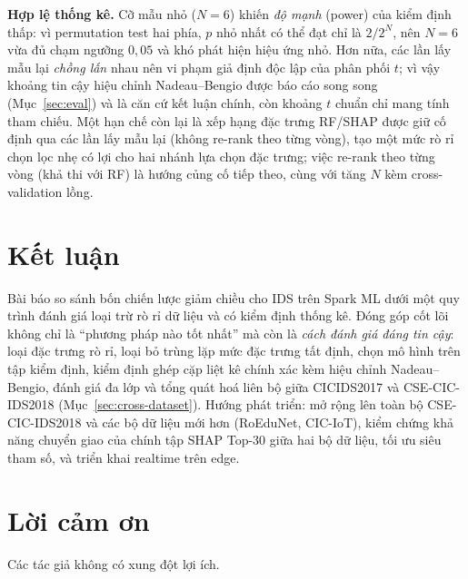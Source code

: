 \documentclass[conference]{IEEEtran}
\begin{document}
\textbf{Hợp lệ thống kê.} Cỡ mẫu nhỏ ($N{=}6$) khiến \emph{độ mạnh} (power) của kiểm định thấp: vì permutation test hai phía, $p$ nhỏ nhất có thể đạt chỉ là $2/2^N$, nên $N{=}6$ vừa đủ chạm ngưỡng $0{,}05$ và khó phát hiện hiệu ứng nhỏ. Hơn nữa, các lần lấy mẫu lại \emph{chồng lấn} nhau nên vi phạm giả định độc lập của phân phối $t$; vì vậy khoảng tin cậy hiệu chỉnh Nadeau--Bengio được báo cáo song song (Mục~\ref{sec:eval}) và là căn cứ kết luận chính, còn khoảng $t$ chuẩn chỉ mang tính tham chiếu. Một hạn chế còn lại là xếp hạng đặc trưng RF/SHAP được giữ cố định qua các lần lấy mẫu lại (không re-rank theo từng vòng), tạo một mức rò rỉ chọn lọc nhẹ có lợi cho hai nhánh lựa chọn đặc trưng; việc re-rank theo từng vòng (khả thi với RF) là hướng củng cố tiếp theo, cùng với tăng $N$ kèm cross-validation lồng.

\section{Kết luận}
\label{sec:conclude}

Bài báo so sánh bốn chiến lược giảm chiều cho IDS trên Spark ML dưới một quy trình đánh giá loại trừ rò rỉ dữ liệu và có kiểm định thống kê. Đóng góp cốt lõi không chỉ là ``phương pháp nào tốt nhất'' mà còn là \emph{cách đánh giá đáng tin cậy}: loại đặc trưng rò rỉ, loại bỏ trùng lặp mức đặc trưng tất định, chọn mô hình trên tập kiểm định, kiểm định ghép cặp liệt kê chính xác kèm hiệu chỉnh Nadeau--Bengio, đánh giá đa lớp và tổng quát hoá liên bộ giữa CICIDS2017 và CSE-CIC-IDS2018 (Mục~\ref{sec:cross-dataset}). Hướng phát triển: mở rộng lên toàn bộ CSE-CIC-IDS2018 và các bộ dữ liệu mới hơn (RoEduNet, CIC-IoT), kiểm chứng khả năng chuyển giao của chính tập SHAP Top-30 giữa hai bộ dữ liệu, tối ưu siêu tham số, và triển khai realtime trên edge.

\section*{Lời cảm ơn}
Các tác giả không có xung đột lợi ích.



\end{document}
